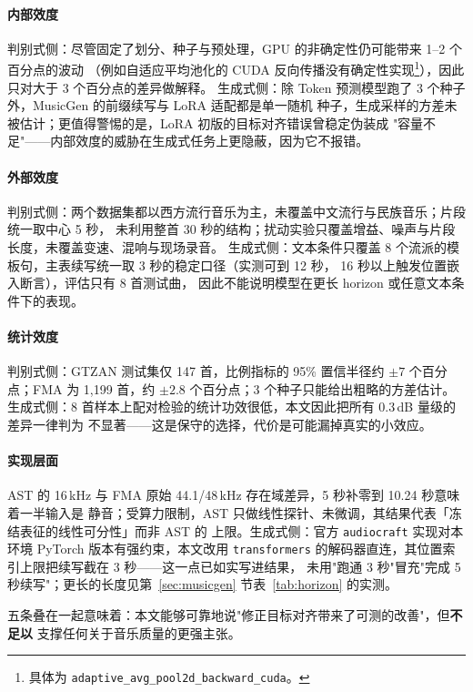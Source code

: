 \documentclass[UTF8,10pt,a4paper]{ctexart}
\begin{document}
\paragraph{内部效度}
判别式侧：尽管固定了划分、种子与预处理，GPU 的非确定性仍可能带来 1--2 个百分点的波动
（例如自适应平均池化的 CUDA 反向传播没有确定性实现\footnote{具体为
\texttt{adaptive\_avg\_pool2d\_backward\_cuda}。}），因此只对大于 3 个百分点的差异做解释。
生成式侧：除 Token 预测模型跑了 3 个种子外，MusicGen 的前缀续写与 LoRA 适配都是单一随机
种子，生成采样的方差未被估计；更值得警惕的是，LoRA 初版的目标对齐错误曾稳定伪装成
"容量不足"——内部效度的威胁在生成式任务上更隐蔽，因为它不报错。

\paragraph{外部效度}
判别式侧：两个数据集都以西方流行音乐为主，未覆盖中文流行与民族音乐；片段统一取中心 5 秒，
未利用整首 30 秒的结构；扰动实验只覆盖增益、噪声与片段长度，未覆盖变速、混响与现场录音。
生成式侧：文本条件只覆盖 8 个流派的模板句，主表续写统一取 3 秒的稳定口径（实测可到 12 秒，
16 秒以上触发位置嵌入断言），评估只有 8 首测试曲，
因此不能说明模型在更长 horizon 或任意文本条件下的表现。

\paragraph{统计效度}
判别式侧：GTZAN 测试集仅 147 首，比例指标的 95\% 置信半径约 $\pm 7$ 个百分点；FMA 为
1,199 首，约 $\pm 2.8$ 个百分点；3 个种子只能给出粗略的方差估计。
生成式侧：8 首样本上配对检验的统计功效很低，本文因此把所有 0.3\,dB 量级的差异一律判为
不显著——这是保守的选择，代价是可能漏掉真实的小效应。

\paragraph{实现层面}
AST 的 16\,kHz 与 FMA 原始 44.1/48\,kHz 存在域差异，5 秒补零到 10.24 秒意味着一半输入是
静音；受算力限制，AST 只做线性探针、未微调，其结果代表「冻结表征的线性可分性」而非 AST 的
上限。生成式侧：官方 \texttt{audiocraft} 实现对本环境 PyTorch 版本有强约束，本文改用
\texttt{transformers} 的解码器直连，其位置索引上限把续写截在 3 秒——这一点已如实写进结果，
未用"跑通 3 秒"冒充"完成 5 秒续写"；更长的长度见第~\ref{sec:musicgen} 节表~\ref{tab:horizon} 的实测。

五条叠在一起意味着：本文能够可靠地说"修正目标对齐带来了可测的改善"，但\textbf{不足以}
支撑任何关于音乐质量的更强主张。
\end{document}
